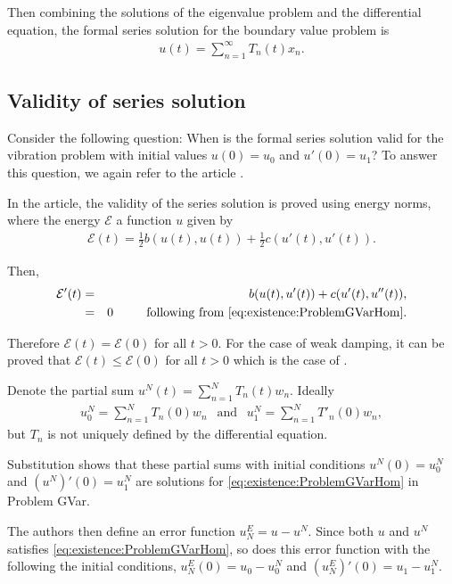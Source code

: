 Then combining the solutions of the eigenvalue problem and the differential equation, the formal series solution for the boundary value problem is
\begin{eqnarray}
	u(t) = \sum_{n=1}^{\infty} T_n(t)x_n. \label{eq:1D_Model:ModalAnalysisSeriesSolution}
\end{eqnarray}


\subsection{Validity of series solution}
Consider the following question: When is the formal series solution valid for the vibration problem with initial values $u(0) = u_0$ and $u'(0) = u_1$? To answer this question, we again refer to the article \cite{CVV18}.

In the article, the validity of the series solution is proved using energy norms, where the energy $\mathcal{E}$ a function $u$ given by \label{sym:Energy}
\begin{eqnarray}
	\mathcal{E} (t) = \frac{1}{2} b(u(t), u(t)) + \frac{1}{2} c(u'(t), u'(t)). \label{eq:1D_Model:ModalAnalysisEnergy}
\end{eqnarray}

Then,
\begin{eqnarray*}
	\mathcal{E}'(t) & = & b(u(t), u'(t)) + c(u'(t), u''(t)),\\
					& = & 0 \ \ \ \ \ \ \ \textrm{ following from \eqref{eq:existence:ProblemGVarHom}}. 
\end{eqnarray*}

Therefore $\mathcal{E}(t) = \mathcal{E}(0)$ for all $t>0$. For the case of weak damping, it can be proved that $\mathcal{E}(t) \leq \mathcal{E}(0)$ for all $t>0$ which is the case of \cite{CVV18}.

Denote the partial sum $u^{N}(t) = \sum_{n=1}^{N} T_{n}(t)w_n$. Ideally
\begin{eqnarray*}
	u_0^{N} = \sum_{n=1}^{N} T_n(0) w_n \ \ \textrm{ and } \ \ u_{1}^{N} =\sum_{n=1}^{N} T'_n(0) w_n,
\end{eqnarray*}
but $T_n$ is not uniquely defined by the differential equation.

Substitution shows that these partial sums with initial conditions $u^N(0) = u^N_0$ and $(u^N)'(0) = u^N_1$ are solutions for \eqref{eq:existence:ProblemGVarHom} in Problem GVar.

The authors then define an error function $u^E_N = u - u^N$. Since both $u$ and $u^N$ satisfies \eqref{eq:existence:ProblemGVarHom}, so does this error function with the following the initial conditions, $u^E_N(0) = u_0 - u^N_0$ and $(u^E_N)'(0) = u_1 - u^N_1$.

